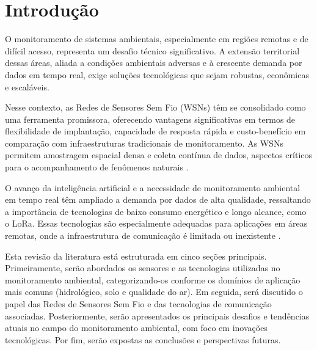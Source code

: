 \chapter{Introdução} \label{cap:intro}

O monitoramento de sistemas ambientais, especialmente em regiões remotas e de difícil acesso, representa um desafio técnico significativo. A extensão territorial dessas áreas, aliada a condições ambientais adversas e à crescente demanda por dados em tempo real, exige soluções tecnológicas que sejam robustas, econômicas e escaláveis.

Nesse contexto, as Redes de Sensores Sem Fio (WSNs) têm se consolidado como uma ferramenta promissora, oferecendo vantagens significativas em termos de flexibilidade de implantação, capacidade de resposta rápida e custo-benefício em comparação com infraestruturas tradicionais de monitoramento. As WSNs permitem amostragem espacial densa e coleta contínua de dados, aspectos críticos para o acompanhamento de fenômenos naturais \cite{chen_2013_natural, ferreira_2023_conception, pule_2017_wireless}.

O avanço da inteligência artificial e a necessidade de monitoramento ambiental em tempo real têm ampliado a demanda por dados de alta qualidade, ressaltando a importância de tecnologias de baixo consumo energético e longo alcance, como o LoRa. Essas tecnologias são especialmente adequadas para aplicações em áreas remotas, onde a infraestrutura de comunicação é limitada ou inexistente \cite{pule_2017_wireless, chen_2013_natural, ferreira_2023_conception}.

Esta revisão da literatura está estruturada em cinco seções principais. Primeiramente, serão abordados os sensores e as tecnologias utilizadas no monitoramento ambiental, categorizando-os conforme os domínios de aplicação mais comuns (hidrológico, solo e qualidade do ar). Em seguida, será discutido o papel das Redes de Sensores Sem Fio e das tecnologias de comunicação associadas. Posteriormente, serão apresentados os principais desafios e tendências atuais no campo do monitoramento ambiental, com foco em inovações tecnológicas. Por fim, serão expostas as conclusões e perspectivas futuras.

